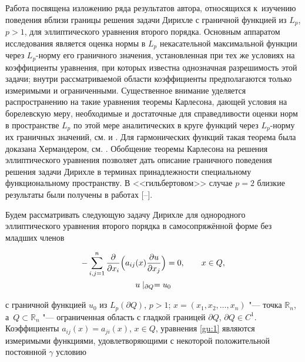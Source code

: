 Работа посвящена изложению ряда результатов автора, относящихся к~изучению поведения вблизи границы решения задачи Дирихле с граничной функцией из $L_p$, $p>1$, для эллиптического уравнения второго порядка. Основным аппаратом исследования является оценка нормы в $L_p$ некасательной максимальной функции через $L_p$-норму его граничного значения, установленная при тех же условиях на коэффициенты уравнения, при которых известна однозначная разрешимость этой задачи; внутри рассматриваемой области коэффициенты предполагаются только измеримыми и ограниченными. Существенное внимание уделяется распространению на такие уравнения теоремы Карлесона, дающей условия на борелевскую меру, необходимые и достаточные для справедливости оценки норм в пространстве $L_p$ по этой мере  аналитических в круге функций через $L_p$-норму их граничных значений, см. \cite{Car58} и \cite{Car62}. Для гармонических функций такая теорема была доказана Хермандером, см. \cite{Her}. Обобщение теоремы Карлесона на решения эллиптического уравнения позволяет дать описание граничного поведения решения задачи Дирихле в терминах принадлежности специальному функциональному пространству. В <<гильбертовом>> случае $p = 2$ близкие результаты были получены в работах [--].



Будем рассматривать следующую задачу Дирихле для однородного эллиптического уравнения второго порядка в самосопряжённой форме без младших членов

\begin{gather}

- \sum\limits_{i,j=1}^n\frac{\partial}{\partial

x_i}\Bigl(a_{ij}(x)\frac{\partial u}{\partial x_j}\Bigr) =   0 , 

\qquad x \in Q, 

\label{gu:1}

\\

u\mid _{\partial Q} = u_0 

\label{gu:2}

\end{gather}

с граничной функцией $u_0$ из $L_p(\partial Q)$, $p > 1$; $x = (x_1, x_2, \ldots , x_n)$ "--- точка ${{\mathbb R}_n}$, а~$Q \subset {{\mathbb R}_n}$ "--- ограниченная область с гладкой границей $\partial Q$, $\partial Q \in C^1$. Коэффициенты   $a_{ij}(x) = a_{ji}(x)$, $x \in Q$, уравнения \eqref{gu:1} являются измеримыми функциями, удовлетворяющими с некоторой положительной постоянной $\gamma$ условию 

